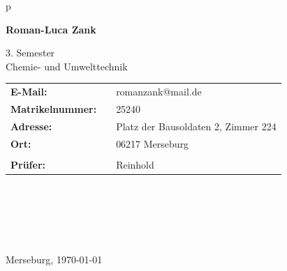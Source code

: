 \begin{center}
\begin{tabular}{p{\textwidth}}
\begin{center}
\Large{\textbf{Roman-Luca Zank}} \\
\end{center}

\begin{center}
3. Semester \\
Chemie- und Umwelttechnik \\
\end{center}


\begin{center}
\begin{tabular}{lll}
	\textbf{E-Mail:} & & romanzank@mail.de\\
	\textbf{Matrikelnummer:} & &25240\\
	\textbf{Adresse:} & &Platz der Bausoldaten 2, Zimmer 224\\
	\textbf{Ort:} & &06217 Merseburg\\
	&& \\
	\textbf{Prüfer:} & & Reinhold\\
\end{tabular}
\end{center}

\\ \\ \\ \\ \\
\large{Merseburg, \today}

\end{tabular}
\end{center}
